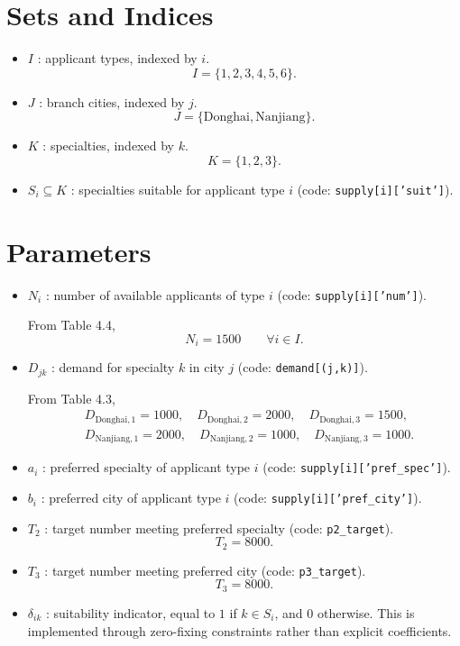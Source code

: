 \section*{Sets and Indices}

\begin{itemize}
\item $I$ : applicant types, indexed by $i$.
\[
I=\{1,2,3,4,5,6\}.
\]

\item $J$ : branch cities, indexed by $j$.
\[
J=\{\text{Donghai},\text{Nanjiang}\}.
\]

\item $K$ : specialties, indexed by $k$.
\[
K=\{1,2,3\}.
\]

\item $S_i \subseteq K$ : specialties suitable for applicant type $i$ (code: \texttt{supply[i]['suit']}).
\end{itemize}

\section*{Parameters}

\begin{itemize}
\item $N_i$ : number of available applicants of type $i$ (code: \texttt{supply[i]['num']}).

From Table 4.4,
\[
N_i=1500 \qquad \forall i\in I.
\]

\item $D_{jk}$ : demand for specialty $k$ in city $j$ (code: \texttt{demand[(j,k)]}).

From Table 4.3,
\[
\begin{aligned}
&D_{\text{Donghai},1}=1000,\quad D_{\text{Donghai},2}=2000,\quad D_{\text{Donghai},3}=1500,\\
&D_{\text{Nanjiang},1}=2000,\quad D_{\text{Nanjiang},2}=1000,\quad D_{\text{Nanjiang},3}=1000.
\end{aligned}
\]

\item $a_i$ : preferred specialty of applicant type $i$ (code: \texttt{supply[i]['pref\_spec']}).

\item $b_i$ : preferred city of applicant type $i$ (code: \texttt{supply[i]['pref\_city']}).

\item $T_2$ : target number meeting preferred specialty (code: \texttt{p2\_target}).
\[
T_2=8000.
\]

\item $T_3$ : target number meeting preferred city (code: \texttt{p3\_target}).
\[
T_3=8000.
\]

\item $\delta_{ik}$ : suitability indicator, equal to $1$ if $k\in S_i$, and $0$ otherwise.
This is implemented through zero-fixing constraints rather than explicit coefficients.
\end{itemize}

